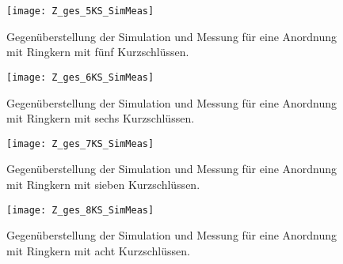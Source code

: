 \begin{figure}[htb]
	\centering
	\texttt{[image: Z\_ges\_5KS\_SimMeas]}
	\caption{Gegen\"uberstellung der Simulation und Messung f\"ur eine Anordnung mit Ringkern mit f\"unf Kurzschl\"ussen.}
	\label{fig:boxpolycrossrk5ksappend}
\end{figure}

\begin{figure}[htb]
	\centering
	\texttt{[image: Z\_ges\_6KS\_SimMeas]}
	\caption{Gegen\"uberstellung der Simulation und Messung f\"ur eine Anordnung mit Ringkern mit sechs Kurzschl\"ussen.}
	\label{fig:boxpolycrossrk6ksappend}
\end{figure}

\begin{figure}[htb]
	\centering
	\texttt{[image: Z\_ges\_7KS\_SimMeas]}
	\caption{Gegen\"uberstellung der Simulation und Messung f\"ur eine Anordnung mit Ringkern mit sieben Kurzschl\"ussen.}
	\label{fig:boxpolycrossrk7ksappend}
\end{figure}

\begin{figure}[htb]
	\centering
	\texttt{[image: Z\_ges\_8KS\_SimMeas]}
	\caption{Gegen\"uberstellung der Simulation und Messung f\"ur eine Anordnung mit Ringkern mit acht Kurzschl\"ussen.}
	\label{fig:boxpolycrossrk8ksappend}
\end{figure}